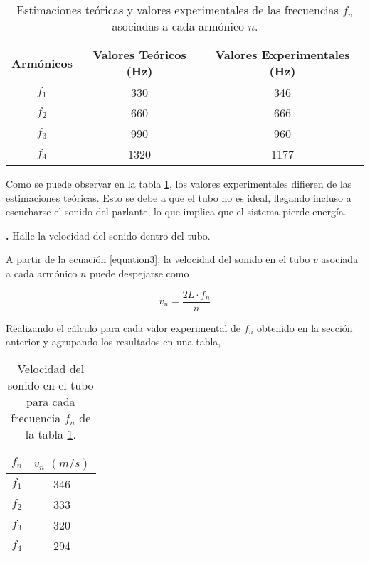 \documentclass[12pt, a4paper]{article}
\newcounter{step}
\newcommand{\step}[1]
{
  \par\vspace{2ex}
  \stepcounter{step}
  \noindent\textbf{\arabic{step}.} #1\par\vspace{1ex}
}
\begin{document}
\begin{table}[H]
    \centering
    \begin{tabular}{|c|c|c|}
    \hline
    \multirow{2}{2.1cm}{ Armónicos }
        & Valores Teóricos (Hz) & Valores Experimentales (Hz)\\
    \hline
    $f_1$  & 330  & 346 \\ \hline
    $f_2$  & 660 & 666 \\ \hline
    $f_3$  & 990 & 960 \\ \hline
    $f_4$  & 1320  & 1177 \\ \hline
    \end{tabular}
    \caption{Estimaciones teóricas y valores experimentales de las frecuencias $f_{n}$ asociadas a cada armónico $n$.}
    \label{tabla1}
\end{table}

Como se puede observar en la tabla \ref{tabla1}, los valores experimentales difieren de las estimaciones teóricas. Esto se debe a que el tubo no es ideal, llegando incluso a escucharse el sonido del parlante, lo que implica que el sistema pierde energía.


\step{Halle la velocidad del sonido dentro del tubo.}

A partir de la ecuación \ref{equation3}, la velocidad del sonido en el tubo $v$ asociada a cada armónico $n$ puede despejarse como

\begin{equation}
  v_{n} = \frac{2L \cdot f_{n}}{n}
  \label{equation4}
\end{equation}

Realizando el cálculo para cada valor experimental de $f_{n}$ obtenido en la sección anterior y agrupando los resultados en una tabla,

\begin{table}[H]
    \centering
    \begin{tabular}{|c|c|}
    \hline
    \multirow{1}{2.1cm}{\centering $f_n$} 
        & $v_{n}$ $(m/s)$ \\
    \hline
    $f_1$  & 346 \\ \hline
    $f_2$  & 333 \\ \hline
    $f_3$  & 320 \\ \hline
    $f_4$  & 294  \\ \hline
    \end{tabular}
    \caption{Velocidad del sonido en el tubo para cada frecuencia $f_{n}$ de la tabla \ref{tabla1}.}
    \label{tabla2}
\end{table}
\end{document}
